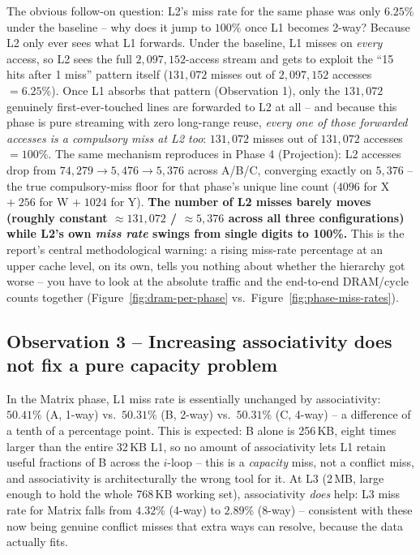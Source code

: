\documentclass[11pt]{article}
\begin{document}
The obvious follow-on question: L2's miss rate for the same phase was only
$6.25\%$ under the baseline -- why does it jump to $100\%$ once L1 becomes
2-way? Because L2 only ever sees what L1 forwards. Under the baseline, L1
misses on \emph{every} access, so L2 sees the full $2{,}097{,}152$-access
stream and gets to exploit the ``15 hits after 1 miss'' pattern itself
($131{,}072$ misses out of $2{,}097{,}152$ accesses $= 6.25\%$). Once L1
absorbs that pattern (Observation 1), only the $131{,}072$ genuinely
first-ever-touched lines are forwarded to L2 at all -- and because this
phase is pure streaming with zero long-range reuse, \emph{every one of
those forwarded accesses is a compulsory miss at L2 too}: $131{,}072$
misses out of $131{,}072$ accesses $=100\%$. The same mechanism reproduces
in Phase 4 (Projection): L2 accesses drop from $74{,}279 \to 5{,}476 \to
5{,}376$ across A/B/C, converging exactly on $5{,}376$ -- the true
compulsory-miss floor for that phase's unique line count ($4096$ for X
$+\;256$ for W $+\;1024$ for Y). \textbf{The number of L2 misses barely
moves (roughly constant $\approx 131{,}072$ / $\approx 5{,}376$ across all
three configurations) while L2's own \emph{miss rate} swings from
single digits to 100\%.} This is the report's central methodological
warning: a rising miss-rate percentage at an upper cache level, on its
own, tells you nothing about whether the hierarchy got worse -- you have
to look at the absolute traffic and the end-to-end DRAM/cycle counts
together (Figure~\ref{fig:dram-per-phase} vs.\ Figure~\ref{fig:phase-miss-rates}).

\subsection{Observation 3 -- Increasing associativity does not fix a pure capacity problem}

In the Matrix phase, L1 miss rate is essentially unchanged by
associativity: $50.41\%$ (A, 1-way) vs.\ $50.31\%$ (B, 2-way) vs.\
$50.31\%$ (C, 4-way) -- a difference of a tenth of a percentage point.
This is expected: B alone is 256\,KB, eight times larger than the entire
32\,KB L1, so no amount of associativity lets L1 retain useful fractions
of B across the $i$-loop -- this is a \emph{capacity} miss, not a
conflict miss, and associativity is architecturally the wrong tool for
it. At L3 (2\,MB, large enough to hold the whole 768\,KB working set),
associativity \emph{does} help: L3 miss rate for Matrix falls from
$4.32\%$ (4-way) to $2.89\%$ (8-way) -- consistent with these now being
genuine conflict misses that extra ways can resolve, because the data
actually fits.
\end{document}
